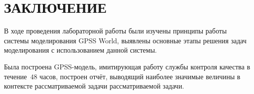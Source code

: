 \section*{ЗАКЛЮЧЕНИЕ}

В ходе проведения лабораторной работы были изучены принципы работы системы моделирования
GPSS World, выявлены основные этапы  решения задач моделирования с использованием данной системы.

Была построена GPSS-модель, имитирующая работу службы контроля качества в течение~$48$ часов,
построен отчёт, выводящий наиболее значимые величины в контексте рассматриваемой задачи рассматриваемой задачи.

\newpage
